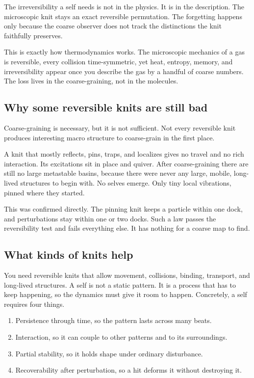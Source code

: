 \begin{result}
The irreversibility a self needs is not in the physics. It is in the description. The microscopic knit stays an exact reversible permutation. The forgetting happens only because the coarse observer does not track the distinctions the knit faithfully preserves.
\end{result}

This is exactly how thermodynamics works. The microscopic mechanics of a gas is reversible, every collision time-symmetric, yet heat, entropy, memory, and irreversibility appear once you describe the gas by a handful of coarse numbers. The loss lives in the coarse-graining, not in the molecules.

\subsection{Why some reversible knits are still bad}

Coarse-graining is necessary, but it is not sufficient. Not every reversible knit produces interesting macro structure to coarse-grain in the first place.

A knit that mostly reflects, pins, traps, and localizes gives no travel and no rich interaction. Its excitations sit in place and quiver. After coarse-graining there are still no large metastable basins, because there were never any large, mobile, long-lived structures to begin with. No selves emerge. Only tiny local vibrations, pinned where they started.

This was confirmed directly. The pinning knit keeps a particle within one dock, and perturbations stay within one or two docks. Such a law passes the reversibility test and fails everything else. It has nothing for a coarse map to find.

\subsection{What kinds of knits help}

You need reversible knits that allow movement, collisions, binding, transport, and long-lived structures. A self is not a static pattern. It is a process that has to keep happening, so the dynamics must give it room to happen. Concretely, a self requires four things.

\begin{enumerate}
\item Persistence through time, so the pattern lasts across many beats.
\item Interaction, so it can couple to other patterns and to its surroundings.
\item Partial stability, so it holds shape under ordinary disturbance.
\item Recoverability after perturbation, so a hit deforms it without destroying it.
\end{enumerate}

